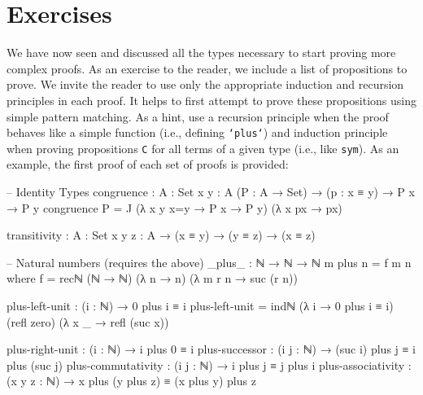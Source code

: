 \documentclass[12pt]{article}
\begin{document}
\section{Exercises}
We have now seen and discussed all the types necessary to start proving more
complex proofs. As an exercise to the reader, we include a list of propositions
to prove. We invite the reader to use only the appropriate induction and
recursion principles in each proof. It helps to first attempt to prove these
propositions using simple pattern matching. As a hint, use a recursion principle
when the proof behaves like a simple function (i.e., defining {\tt `plus`}) and
induction principle when proving propositions {\tt C} for all terms of a given
type (i.e., like {\tt sym}). As an example, the first proof of each set of
proofs is provided:

\begin{center}
\begin{minipage}{0.9\textwidth}
\begin{code}
-- Identity Types
congruence : {A : Set} {x y : A} (P : A → Set) →
             (p : x ≡ y) → P x → P y
congruence P = 
  J (λ {x y} x=y → P x → P y)
    (λ x px → px)

transitivity : {A : Set} {x y z : A} → (x ≡ y) →
               (y ≡ z) → (x ≡ z)
\end{code}
\end{minipage}
\end{center}

\begin{center}
\begin{minipage}{0.9\textwidth}
\begin{code}
-- Natural numbers (requires the above)
_plus_ : ℕ → ℕ → ℕ
m plus n = f m n where
  f = recℕ (ℕ → ℕ) (λ n → n) (λ m r n → suc (r n))

plus-left-unit : (i : ℕ) → 0 plus i ≡ i
plus-left-unit = 
  indℕ (λ i → 0 plus i ≡ i)
        (refl zero)
        (λ x _ → refl (suc x))

plus-right-unit : (i : ℕ) → i plus 0 ≡ i
plus-successor : (i j : ℕ) → (suc i) plus j ≡ i plus (suc j)
plus-commutativity : (i j : ℕ) → i plus j ≡ j plus i
plus-associativity : (x y z : ℕ) →
                     x plus (y plus z) ≡ (x plus y) plus z
\end{code}
\end{minipage}
\end{center}
\end{document}
